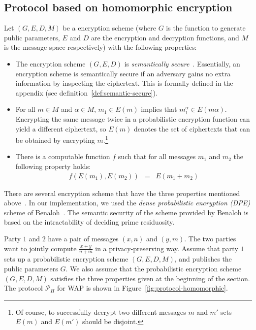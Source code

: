 \subsection{Protocol based on homomorphic encryption}
\label{subsec:homomorphic}

Let $(G,E,D,M)$ be a encryption scheme (where $G$ is the function to
generate public parameters, $E$ and $D$ are the encryption and
decryption functions, and $M$ is the message space respectively) with
the following properties:
\begin{itemize}
\item The encryption scheme $(G,E,D)$ is {\em semantically secure}~\cite{Goldwasser:Micali}.
Essentially, an encryption scheme is semantically secure
if an adversary gains no extra information by inspecting the ciphertext.
This is formally defined in the appendix (see definition~\ref{def:semantic-secure}).


\item  For all $m \in M$ and $\alpha \in M$, $m_1 \in E(m)$
implies that $m_1^\alpha \in E(m \alpha)$. Encrypting the same
message twice in a probabilistic encryption function can
yield a different ciphertext, so $E(m)$ denotes the set of
ciphertexts that can be obtained by encrypting $m$.\footnote{
Of course, to successfully decrypt  two different messages
$m$ and $m'$ sets $E(m)$ and $E(m')$ should be disjoint.}

\item There is a computable function $f$ such that for all messages $m_1$ and $m_2$
the following property holds:
\begin{eqnarray*}
f(E(m_1),E(m_2)) & = & E (m_1+m_2)
\end{eqnarray*}
\end{itemize}
There are several encryption scheme that have the three properties
mentioned above~\cite{Benaloh:94,Naccache-Stern,Paillier99}. In our
implementation, we used the {\it dense probabilistic encryption (DPE)}
scheme of Benaloh~\cite{Benaloh:94}. The semantic security of the
scheme provided by Benaloh is based on the intractability of 
deciding prime residuosity.



Party $1$ and $2$
have a pair of messages $(x,n)$ and $(y,m)$. The two parties want to
jointly compute $\frac{x+y}{n+m}$ in a privacy-preserving way. Assume
that party $1$ sets up a probabilistic encryption scheme $(G,E,D,M)$, and
publishes the public parameters $G$. We also assume that the probabilistic
encryption scheme $(G,E,D,M)$ satisfies the three properties given at the
beginning of the section. The protocol $\mathcal{P}_H$ for WAP is shown
in Figure~\ref{fig:protocol-homomorphic}.

